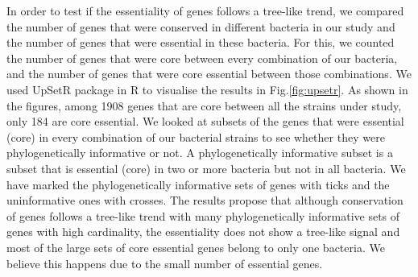 \documentclass[12pt,letterpaper]{article}
\begin{document}
In order to test if the essentiality of genes follows a tree-like trend, we compared the number of genes that were conserved in different bacteria in our study and the number of genes that were essential in these bacteria. For this, we counted the number of genes that were core between every combination of our bacteria, and the number of genes that were core essential between those combinations. We used UpSetR package \cite{conway_upsetr:_2016} in R to visualise the results in Fig.\@ \ref{fig:upsetr}. As shown in the figures, among 1908 genes that are core between all the strains under study, only 184 are core essential. We looked at subsets of the genes that were essential (core) in every combination of our bacterial strains to see whether they were phylogenetically informative or not. A phylogenetically informative subset is a subset that is essential (core) in two or more bacteria but not in all bacteria. We have marked the phylogenetically informative sets of genes with ticks and the uninformative ones with crosses. The results propose that although conservation of genes follows a tree-like trend with many phylogenetically informative sets of genes with high cardinality, the essentiality does not show a tree-like signal and most of the large sets of core essential genes belong to only one bacteria. We believe this happens due to the small number of essential genes. 
\end{document}
